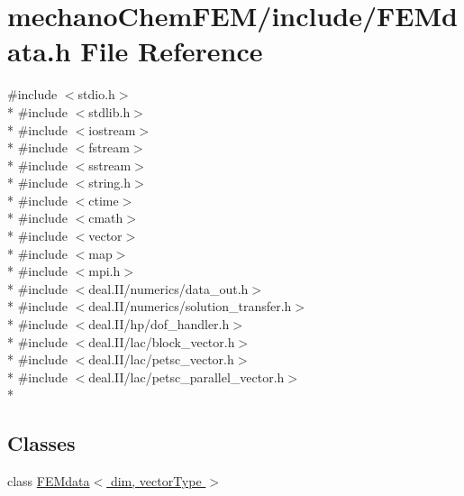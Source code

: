 \section{mechano\-Chem\-F\-E\-M/include/\-F\-E\-Mdata.h File Reference}
\label{_f_e_mdata_8h}
{\ttfamily \#include $<$stdio.\-h$>$}\\*
{\ttfamily \#include $<$stdlib.\-h$>$}\\*
{\ttfamily \#include $<$iostream$>$}\\*
{\ttfamily \#include $<$fstream$>$}\\*
{\ttfamily \#include $<$sstream$>$}\\*
{\ttfamily \#include $<$string.\-h$>$}\\*
{\ttfamily \#include $<$ctime$>$}\\*
{\ttfamily \#include $<$cmath$>$}\\*
{\ttfamily \#include $<$vector$>$}\\*
{\ttfamily \#include $<$map$>$}\\*
{\ttfamily \#include $<$mpi.\-h$>$}\\*
{\ttfamily \#include $<$deal.\-I\-I/numerics/data\-\_\-out.\-h$>$}\\*
{\ttfamily \#include $<$deal.\-I\-I/numerics/solution\-\_\-transfer.\-h$>$}\\*
{\ttfamily \#include $<$deal.\-I\-I/hp/dof\-\_\-handler.\-h$>$}\\*
{\ttfamily \#include $<$deal.\-I\-I/lac/block\-\_\-vector.\-h$>$}\\*
{\ttfamily \#include $<$deal.\-I\-I/lac/petsc\-\_\-vector.\-h$>$}\\*
{\ttfamily \#include $<$deal.\-I\-I/lac/petsc\-\_\-parallel\-\_\-vector.\-h$>$}\\*
\subsection*{Classes}
\begin{DoxyCompactItemize}
\item 
class \hyperlink{class_f_e_mdata}{F\-E\-Mdata$<$ dim, vector\-Type $>$}
\end{DoxyCompactItemize}
